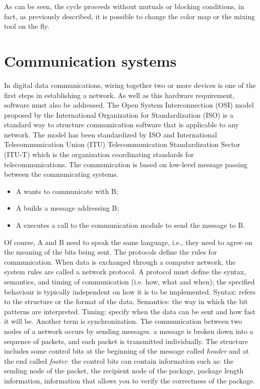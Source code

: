 As can be seen, the cycle proceeds without mutuals or blocking conditions, in
fact, as previously described, it is possible to change the color map or the
mixing tool on the fly.
%
\newpage
\section{Communication systems}
\label{sec:software-TCPSocket}
In digital data communications, wiring together two or more devices is one of
the first steps in establishing a network. As well as this hardware requirement,
software must also be addressed. The Open System Interconnection (OSI) model
proposed by the International Organization for Standardization (ISO) is a
standard way to structure communication software that is applicable to any
network. The model has been standardized by ISO and International
Telecommunication Union (ITU) Telecommunication Standardization Sector (ITU-T)
which is the organization coordinating standards for telecommunications. 
The
communication is based on low-level message passing between the communicating
systems.
\begin{itemize}
\item A wants to communicate with B; 
\item A builds a message addressing B; 
\item A executes a call to the communication module to send the message to B.
\end{itemize}
Of course, A and B need to speak the same language, i.e., they need to agree on
the meaning of the bits being sent. The protocols define the rules for
communication.  
When data is exchanged through a computer network, the system rules are called a
network protocol. 
A protocol must define the syntax, semantics, and timing of communication (i.e.
how, what and when); the specified behaviour is typically independent on how it
is to be implemented. 
Syntax: refers to the structure or the format of the data.
Semantics: the way in which the bit patterns are interpreted. Timing: specify
when the data can be sent and how fast it will be. Another term is
synchronization.
The communication between two nodes of a network occurs by sending messages. a
message is broken down into a sequence of packets, and each packet is
transmitted individually.
The structure includes some control bits at the beginning of the message called
\emph{header} and at the end called \emph{footer}.
the control bits can contain information such as: the sending node of the
packet, the recipient node of the package, package length information,
information that allows you to verify the correctness of the package. \cite{mandrioli2008informatica}
%
